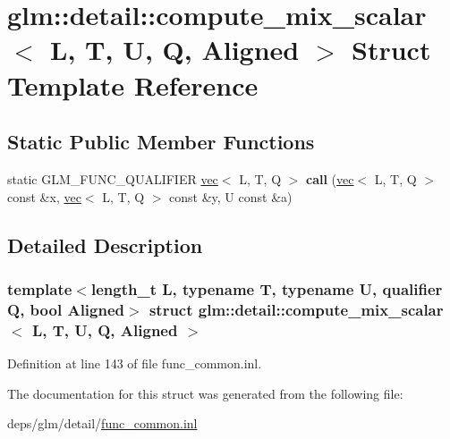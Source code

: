 \hypertarget{structglm_1_1detail_1_1compute__mix__scalar}{}\section{glm\+:\+:detail\+:\+:compute\+\_\+mix\+\_\+scalar$<$ L, T, U, Q, Aligned $>$ Struct Template Reference}
\label{structglm_1_1detail_1_1compute__mix__scalar}
\subsection*{Static Public Member Functions}
\begin{DoxyCompactItemize}
\item 
\mbox{\label{structglm_1_1detail_1_1compute__mix__scalar_a5938ae634fdc3c78b143165b19c28b7d}} 
static G\+L\+M\+\_\+\+F\+U\+N\+C\+\_\+\+Q\+U\+A\+L\+I\+F\+I\+ER \hyperlink{structglm_1_1vec}{vec}$<$ L, T, Q $>$ {\bfseries call} (\hyperlink{structglm_1_1vec}{vec}$<$ L, T, Q $>$ const \&x, \hyperlink{structglm_1_1vec}{vec}$<$ L, T, Q $>$ const \&y, U const \&a)
\end{DoxyCompactItemize}


\subsection{Detailed Description}
\subsubsection*{template$<$length\+\_\+t L, typename T, typename U, qualifier Q, bool Aligned$>$\newline
struct glm\+::detail\+::compute\+\_\+mix\+\_\+scalar$<$ L, T, U, Q, Aligned $>$}



Definition at line 143 of file func\+\_\+common.\+inl.



The documentation for this struct was generated from the following file\+:\begin{DoxyCompactItemize}
\item 
deps/glm/detail/\hyperlink{func__common_8inl}{func\+\_\+common.\+inl}\end{DoxyCompactItemize}
